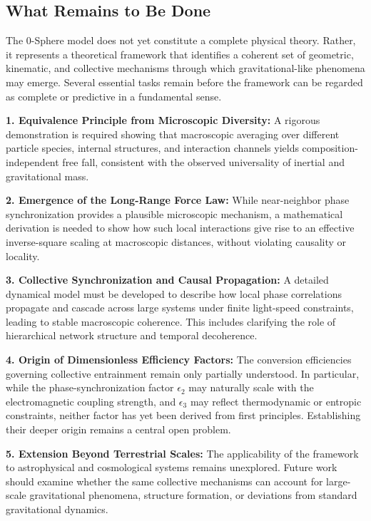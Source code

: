 \documentclass[12pt,letterpaper]{article}
\begin{document}

\subsection{What Remains to Be Done}
\label{subsec:remaining}

The 0-Sphere model does not yet constitute a complete physical theory. Rather, it represents a theoretical framework that identifies a coherent set of geometric, kinematic, and collective mechanisms through which gravitational-like phenomena may emerge. Several essential tasks remain before the framework can be regarded as complete or predictive in a fundamental sense.

\textbf{1. Equivalence Principle from Microscopic Diversity:} A rigorous demonstration is required showing that macroscopic averaging over different particle species, internal structures, and interaction channels yields composition-independent free fall, consistent with the observed universality of inertial and gravitational mass.

\textbf{2. Emergence of the Long-Range Force Law:} While near-neighbor phase synchronization provides a plausible microscopic mechanism, a mathematical derivation is needed to show how such local interactions give rise to an effective inverse-square scaling at macroscopic distances, without violating causality or locality.

\textbf{3. Collective Synchronization and Causal Propagation:} A detailed dynamical model must be developed to describe how local phase correlations propagate and cascade across large systems under finite light-speed constraints, leading to stable macroscopic coherence. This includes clarifying the role of hierarchical network structure and temporal decoherence.

\textbf{4. Origin of Dimensionless Efficiency Factors:} The conversion efficiencies governing collective entrainment remain only partially understood. In particular, while the phase-synchronization factor $\epsilon_2$ may naturally scale with the electromagnetic coupling strength, and $\epsilon_3$ may reflect thermodynamic or entropic constraints, neither factor has yet been derived from first principles. Establishing their deeper origin remains a central open problem.

\textbf{5. Extension Beyond Terrestrial Scales:} The applicability of the framework to astrophysical and cosmological systems remains unexplored. Future work should examine whether the same collective mechanisms can account for large-scale gravitational phenomena, structure formation, or deviations from standard gravitational dynamics.
\end{document}
